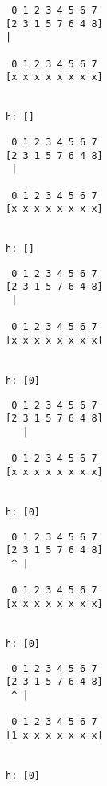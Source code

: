 { \begin{verbatim}
                    0 1 2 3 4 5 6 7
                   [2 3 1 5 7 6 4 8]
                   |

                    0 1 2 3 4 5 6 7
                   [x x x x x x x x]


                   h: []
\end{verbatim} }

{ \begin{verbatim}
                    0 1 2 3 4 5 6 7
                   [2 3 1 5 7 6 4 8]
                    |

                    0 1 2 3 4 5 6 7
                   [x x x x x x x x]


                   h: []
\end{verbatim} }

{ \begin{verbatim}
                    0 1 2 3 4 5 6 7
                   [2 3 1 5 7 6 4 8]
                    |

                    0 1 2 3 4 5 6 7
                   [x x x x x x x x]


                   h: [0]
\end{verbatim} }

{ \begin{verbatim}
                    0 1 2 3 4 5 6 7
                   [2 3 1 5 7 6 4 8]
                      |

                    0 1 2 3 4 5 6 7
                   [x x x x x x x x]


                   h: [0]
\end{verbatim} }

{ \begin{verbatim}
                    0 1 2 3 4 5 6 7
                   [2 3 1 5 7 6 4 8]
                    ^ |

                    0 1 2 3 4 5 6 7
                   [x x x x x x x x]


                   h: [0]
\end{verbatim} }

{ \begin{verbatim}
                    0 1 2 3 4 5 6 7
                   [2 3 1 5 7 6 4 8]
                    ^ |

                    0 1 2 3 4 5 6 7
                   [1 x x x x x x x]


                   h: [0]
\end{verbatim} }

